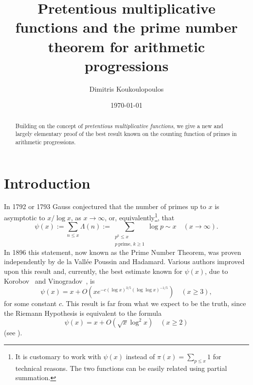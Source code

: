 \documentclass[12pt]{amsart}
\theoremstyle{remark}
\newcommand{\be}{\begin{equation}}
\newcommand{\ee}{\end{equation}}
\numberwithin{equation}{section}
\begin{document}
\title[Pretentious multiplicative functions and primes in arithmetic progressions]{Pretentious multiplicative functions and the prime number theorem for arithmetic progressions}
\author{Dimitris Koukoulopoulos}
\address{D\'epartement de math\'ematiques et de statistique\\
Universit\'e de Montr\'eal\\
CP 6128 succ. Centre-Ville\\
Montr\'eal, QC H3C 3J7\\
Canada}


\date{\today}

\begin{abstract} Building on the concept of \textit{pretentious multiplicative functions}, we give a new and largely elementary proof of the best result known on the counting function of primes in arithmetic progressions.
\end{abstract}

\maketitle

\section{Introduction}\label{intro} In 1792 or 1793 Gauss conjectured that the number of primes up to $x$ is asymptotic to $x/\log x$, as $x\to\infty$, or, equivalently\footnote{It is customary to work with $\psi(x)$ instead of $\pi(x)=\sum_{p\le x}1$ for technical reasons. The two functions can be easily related using partial summation.}, that $$\psi(x):=\sum_{n\le x}\Lambda(n):=\sum_{\substack{p^k\le x\\p\ \text{prime},\,k\ge1}}\log p\sim x\quad(x\to\infty).$$ In 1896 this statement, now known as the Prime Number Theorem, was proven independently by de la Vall\'ee Poussin and Hadamard. Various authors improved upon this result and, currently, the best estimate known for $\psi(x)$, due to Korobov~\cite{korobov} and Vinogradov~\cite{vinogradov}, is
\be\label{pnt_e2}
\psi(x)=x+O\left(xe^{-c(\log x)^{3/5}(\log\log x)^{-1/5}}\right)\quad(x\ge3),
\ee
for some constant $c$. This result is far from what we expect to be the truth, since the Riemann Hypothesis is equivalent to the formula \be\label{rh}
\psi(x)=x+O(\sqrt{x}\log^2x)\quad(x\ge2)
\ee
(see \cite[p. 113]{Dav}).
\end{document}
